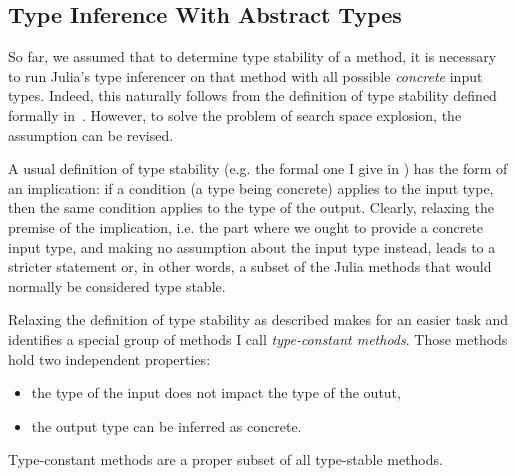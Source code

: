 

\subsection{Type Inference With Abstract Types}%
\label{ssec:approx:space:abstract}

So far, we assumed that to determine type stability of a method, it is necessary
to run Julia's type inferencer on that method with all possible \emph{concrete} input
types. Indeed, this naturally follows from %
the definition of type stability defined formally in~.
However, to solve the problem of search space explosion, 
the assumption can be revised.

A usual definition of type stability (e.g. the formal one I give in
) has the form of an implication: if a condition (a type
being concrete) applies to the input type, then the same condition applies to
the type of the output. Clearly, relaxing the premise of the implication, i.e.
the part where we ought to provide a concrete input type, and making no
assumption about the input type instead, leads to a stricter statement or, in
other words, a subset of the Julia methods that would normally be considered
type stable.

Relaxing the definition of type stability as described makes for an easier task
and identifies a special group of methods I call \emph{type-constant methods}.
Those methods hold two independent properties:
\begin{itemize}
  \item the type of the input does not impact the type of the outut, %
  \item the output type can be inferred as concrete.
\end{itemize}
Type-constant methods are a proper subset of all type-stable methods.

